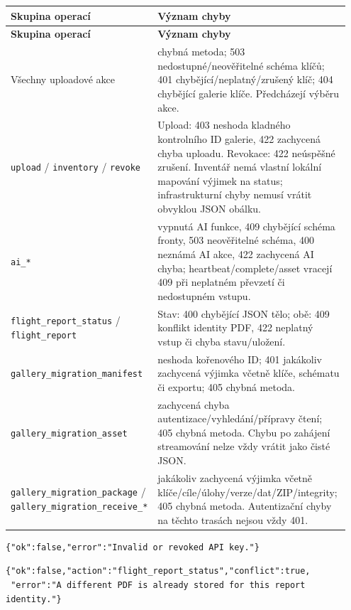 \documentclass[11pt,a4paper]{article}
\newcommand{\codeword}[1]{\nolinkurl{#1}}
\begin{document}
\begin{longtable}{@{}>{\RaggedRight\arraybackslash}p{0.28\linewidth}>{\RaggedRight\arraybackslash}p{0.67\linewidth}@{}}
\toprule
\textbf{Skupina operací} & \textbf{Význam chyby} \\
\midrule
\endfirsthead
\toprule
\textbf{Skupina operací} & \textbf{Význam chyby} \\
\midrule
\endhead
\bottomrule
\endfoot
Všechny uploadové akce & 405 chybná metoda; 503 nedostupné/neověřitelné schéma klíčů; 401
chybějící/neplatný/zrušený klíč; 404 chybějící galerie klíče. Předcházejí výběru akce. \\
\codeword{upload} / \codeword{inventory} / \codeword{revoke} & Upload: 403 neshoda kladného
kontrolního ID galerie, 422 zachycená chyba uploadu. Revokace: 422 neúspěšné zrušení.
Inventář nemá vlastní lokální mapování výjimek na status; infrastrukturní chyby nemusí
vrátit obvyklou JSON obálku. \\
\codeword{ai_*} & 403 vypnutá AI funkce, 409 chybějící schéma fronty, 503 neověřitelné
schéma, 400 neznámá AI akce, 422 zachycená AI chyba; heartbeat/complete/asset vracejí 409
při neplatném převzetí či nedostupném vstupu. \\
\codeword{flight_report_status} / \codeword{flight_report} & Stav: 400 chybějící JSON tělo;
obě: 409 konflikt identity PDF, 422 neplatný vstup či chyba stavu/uložení. \\
\codeword{gallery_migration_manifest} & 403 neshoda kořenového ID; 401 jakákoliv zachycená
výjimka včetně klíče, schématu či exportu; 405 chybná metoda. \\
\codeword{gallery_migration_asset} & 404 zachycená chyba autentizace/vyhledání/přípravy
čtení; 405 chybná metoda. Chybu po zahájení streamování nelze vždy vrátit jako čisté JSON.
\\
\codeword{gallery_migration_package} / \codeword{gallery_migration_receive_*} & 422
jakákoliv zachycená výjimka včetně klíče/cíle/úlohy/verze/dat/ZIP/integrity; 405 chybná
metoda. Autentizační chyby na těchto trasách nejsou vždy 401. \\
\end{longtable}

\begin{lstlisting}[language={}]
{"ok":false,"error":"Invalid or revoked API key."}
\end{lstlisting}

\begin{lstlisting}[language={}]
{"ok":false,"action":"flight_report_status","conflict":true,
 "error":"A different PDF is already stored for this report identity."}
\end{lstlisting}
\end{document}
